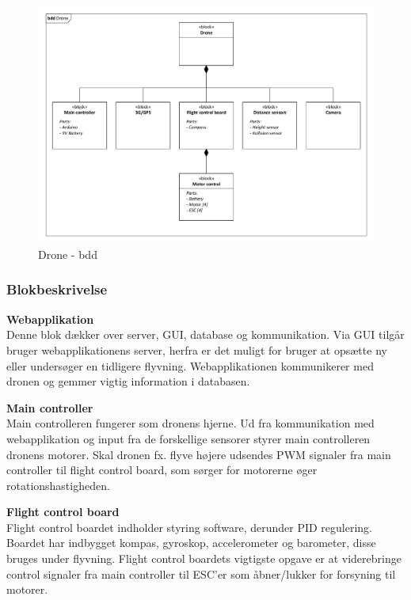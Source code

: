 \begin{figure}[H]
\centering
\includegraphics[width=1\textwidth]{Billeder/BDD/bdd_drone.pdf}
\caption{Drone - bdd}
\label{fig:bdd_drone}
\end{figure}

\newpage

\subsubsection{Blokbeskrivelse}

\textbf{Webapplikation}\\
Denne blok dækker over server, GUI, database og kommunikation. Via GUI tilgår bruger webapplikationens server, herfra er det muligt for bruger at opsætte ny eller undersøger en tidligere flyvning. Webapplikationen kommunikerer med dronen og gemmer vigtig information i databasen.

\textbf{Main controller}\\
Main controlleren fungerer som dronens hjerne. Ud fra kommunikation med webapplikation og input fra de forskellige sensorer styrer main controlleren dronens motorer. Skal dronen fx. flyve højere udsendes PWM signaler fra main controller til flight control board, som sørger for motorerne øger rotationshastigheden. 

\textbf{Flight control board}\\
Flight control boardet indholder styring software, derunder PID regulering. Boardet har indbygget kompas, gyroskop, accelerometer og barometer, disse bruges under flyvning. Flight control boardets vigtigste opgave er at viderebringe control signaler fra main controller til ESC'er som åbner/lukker for forsyning til motorer. 


